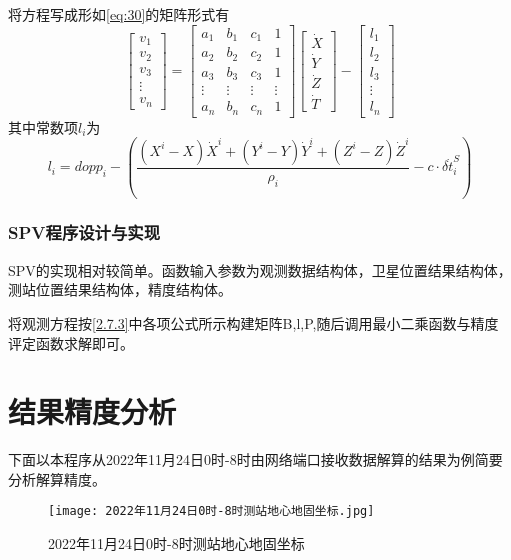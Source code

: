 \documentclass{ctexart}
\begin{document}
将方程写成形如\eqref{eq:30}的矩阵形式有
\begin{equation}
\begin{bmatrix}
v_1\\
v_2\\
v_3\\
\vdots\\
v_n
\end{bmatrix}=\begin{bmatrix}
a_1&b_1&c_1&1\\
a_2&b_2&c_2&1\\
a_3&b_3&c_3&1\\
\vdots&\vdots&\vdots&\vdots\\
a_n&b_n&c_n&1
\end{bmatrix}\begin{bmatrix}
\dot{X}\\
\dot{Y}\\
\dot{Z}\\
\dot{T}
\end{bmatrix}-\begin{bmatrix}
l_1\\
l_2\\
l_3\\
\vdots\\
l_n
\end{bmatrix}
\end{equation}
其中常数项$l_i$为
\begin{equation}
l_i=dopp_i-\left(\dfrac{(X^i-X)\dot{X}^i+(Y^i-Y)\dot{Y}^i+(Z^i-Z)\dot{Z}^i}{\rho_i}-c\cdot\delta\dot{t}^S_i\right)
\end{equation}

\subsubsection{SPV程序设计与实现}
SPV的实现相对较简单。函数输入参数为观测数据结构体，卫星位置结果结构体，测站位置结果结构体，精度结构体。

将观测方程按\ref{2.7.3}中各项公式所示构建矩阵B,l,P,随后调用最小二乘函数与精度评定函数求解即可。
\vfill
\section{结果精度分析}

下面以本程序从2022年11月24日0时-8时由网络端口接收数据解算的结果为例简要分析解算精度。

\begin{figure}[H]
\texttt{[image: 2022年11月24日0时-8时测站地心地固坐标.jpg]}
\caption{2022年11月24日0时-8时测站地心地固坐标}
\end{figure}
\end{document}

